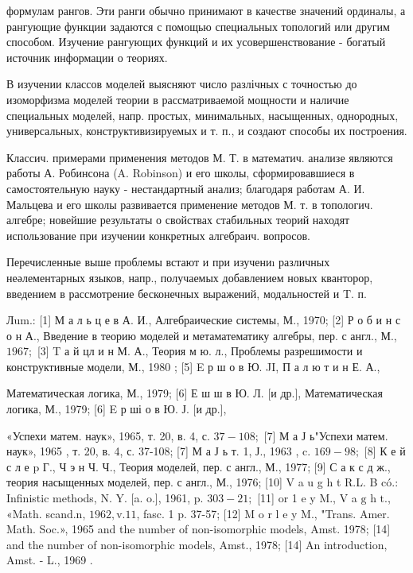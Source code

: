 \documentclass[10pt]{article}
\begin{document}
формулам рангов. Эти ранги обычно принимают в качестве значений ординалы, а рангующие функции задаются с помощью специальных топологий или другим способом. Изучение рангующих функций и их усовершенствование - богатый источник информации о теориях.



В изучении классов моделей выясняют число разлічных с точностью до изоморфизма моделей теории в рассматриваемой мощности и наличие специальных моделей, напр. простых, минимальных, насыщенных, однородных, универсальных, конструктивизируемых и т. п., и создают способы их построения.



Классич. примерами применения методов М. Т. в математич. анализе являются работы А. Робинсона (A. Robinson) и его школы, сформировавшиеся в самостоятельную науку - нестандартный анализ; благодаря работам А. И. Мальцева и его школы развивается применение методов М. т. в топологич. алгебре; новейшие результаты о свойствах стабильных теорий находят использование при изучении конкретных алгебраич. вопросов.



Перечисленные выше проблемы встают и при изучениı различных неәлементарных языков, напр., получаемых добавлением новых кванторор, введением в рассмотрение бесконечных выражений, модальностей и T. п.



Лum.: [1] М а л ь ц е в А. И., Алгебраические системы, М., 1970; [2] Р о б и н с о н А., Введение в теорию моделей и метаматематику алгебры, пер. с англ., М., $1967 ;$ [3] T а й цл и н М. А., Теория м ю. л., Проблемы разрешимости и конструктивные модели, М., 1980 ; [5] E р ш о в Ю. JI, П а л ю т и н Е. А.,

Математическая логика, М., 1979; [6] Е ш ш в Ю. Л. [и др.], Математическая логика, М., 1979; [6] E р ші о в Ю. Ј. [и др.],

«Успехи матем. наук», 1965, т. 20, в. 4, с. $37-108 ;$ [7] М а Ј ь"Успехи матем. наук», 1965 , т. 20, в. 4, с. 37-108; [7] М а Ј ь т. 1, Ј., 1963 , c. $169-98 ;$ [8] К е й с л е p Г., Ч э н Ч. Ч., Теория моделей, пер. с англ., М., 1977; [9] С а к с д ж., теория насыщенных моделей, пер. с англ., М., 1976; [10] V a u g h t R.L. B có.: Infinistic methods, N. Y. [a. o.], 1961, p. $303-21 ;$ [11] or 1 e y M., $\mathrm{V}$ a $\mathrm{g}$ h $\mathrm{t}$., «Math. scand.n, $1962, \mathrm{v} .11$, fasc. 1 p. 37-57; [12] M o r l e y M., "Trans. Amer. Math. Soc.», 1965 and the number of non-isomorphic models, Amst. 1978; [14] and the number of non-isomorphic models, Amst., 1978; [14] An introduction, Amst. - L., 1969 .
\end{document}
